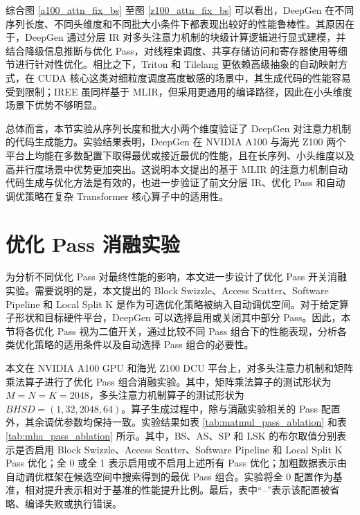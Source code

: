 综合图 \ref{a100_attn_fix_bs} 至图 \ref{z100_attn_fix_bs} 可以看出，DeepGen 在不同序列长度、不同头维度和不同批大小条件下都表现出较好的性能鲁棒性。其原因在于，DeepGen 通过分层 IR 对多头注意力机制的块级计算逻辑进行显式建模，并结合降级信息推断与优化 Pass，对线程束调度、共享存储访问和寄存器使用等细节进行针对性优化。相比之下，Triton 和 Tilelang 更依赖高级抽象的自动映射方式，在 CUDA 核心这类对细粒度调度高度敏感的场景中，其生成代码的性能容易受到限制；IREE 虽同样基于 MLIR，但采用更通用的编译路径，因此在小头维度场景下优势不够明显。

总体而言，本节实验从序列长度和批大小两个维度验证了 DeepGen 对注意力机制的代码生成能力。实验结果表明，DeepGen 在 NVIDIA A100 与海光 Z100 两个平台上均能在多数配置下取得最优或接近最优的性能，且在长序列、小头维度以及高并行度场景中优势更加突出。这说明本文提出的基于 MLIR 的注意力机制自动代码生成与优化方法是有效的，也进一步验证了前文分层 IR、优化 Pass 和自动调优策略在复杂 Transformer 核心算子中的适用性。

\section{优化 Pass 消融实验}

为分析不同优化 Pass 对最终性能的影响，本文进一步设计了优化 Pass 开关消融实验。需要说明的是，本文提出的 Block Swizzle、Access Scatter、Software Pipeline 和 Local Split K 是作为可选优化策略被纳入自动调优空间。对于给定算子形状和目标硬件平台，DeepGen 可以选择启用或关闭其中部分 Pass。因此，本节将各优化 Pass 视为二值开关，通过比较不同 Pass 组合下的性能表现，分析各类优化策略的适用条件以及自动选择 Pass 组合的必要性。

本文在 NVIDIA A100 GPU 和海光 Z100 DCU 平台上，对多头注意力机制和矩阵乘法算子进行了优化 Pass 组合消融实验。其中，矩阵乘法算子的测试形状为 $M=N=K=2048$，多头注意力机制算子的测试形状为 $BHSD=(1,32,2048,64)$。算子生成过程中，除与消融实验相关的 Pass 配置外，其余调优参数均保持一致。实验结果如表 \ref{tab:matmul_pass_ablation} 和表 \ref{tab:mha_pass_ablation} 所示。其中，BS、AS、SP 和 LSK 的布尔取值分别表示是否启用 Block Swizzle、Access Scatter、Software Pipeline 和 Local Split K Pass 优化；全 0 或全 1 表示启用或不启用上述所有 Pass 优化；加粗数据表示由自动调优框架在候选空间中搜索得到的最优 Pass 组合。实验将全 0 配置作为基准，相对提升表示相对于基准的性能提升比例。最后，表中“--”表示该配置被省略、编译失败或执行错误。

